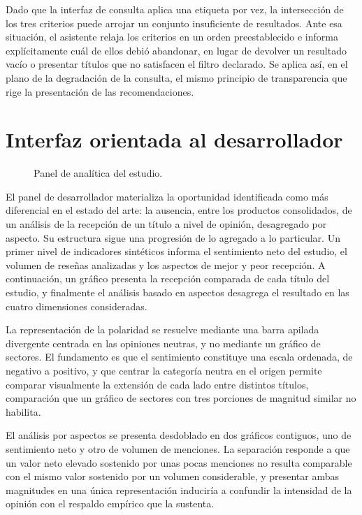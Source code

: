Dado que la interfaz de consulta aplica una etiqueta por vez, la intersección de los tres criterios puede arrojar un conjunto insuficiente de resultados. Ante esa situación, el asistente relaja los criterios en un orden preestablecido e informa explícitamente cuál de ellos debió abandonar, en lugar de devolver un resultado vacío o presentar títulos que no satisfacen el filtro declarado. Se aplica así, en el plano de la degradación de la consulta, el mismo principio de transparencia que rige la presentación de las recomendaciones.

\section*{Interfaz orientada al desarrollador}

\begin{figure}[ht]
	\centering
	\caption{Panel de analítica del estudio.}
	\label{fig:ui-panel-dev}
\end{figure}

El panel de desarrollador materializa la oportunidad identificada como más diferencial en el estado del arte: la ausencia, entre los productos consolidados, de un análisis de la recepción de un título a nivel de opinión, desagregado por aspecto. Su estructura sigue una progresión de lo agregado a lo particular. Un primer nivel de indicadores sintéticos informa el sentimiento neto del estudio, el volumen de reseñas analizadas y los aspectos de mejor y peor recepción. A continuación, un gráfico presenta la recepción comparada de cada título del estudio, y finalmente el análisis basado en aspectos desagrega el resultado en las cuatro dimensiones consideradas.

La representación de la polaridad se resuelve mediante una barra apilada divergente centrada en las opiniones neutras, y no mediante un gráfico de sectores. El fundamento es que el sentimiento constituye una escala ordenada, de negativo a positivo, y que centrar la categoría neutra en el origen permite comparar visualmente la extensión de cada lado entre distintos títulos, comparación que un gráfico de sectores con tres porciones de magnitud similar no habilita.

El análisis por aspectos se presenta desdoblado en dos gráficos contiguos, uno de sentimiento neto y otro de volumen de menciones. La separación responde a que un valor neto elevado sostenido por unas pocas menciones no resulta comparable con el mismo valor sostenido por un volumen considerable, y presentar ambas magnitudes en una única representación induciría a confundir la intensidad de la opinión con el respaldo empírico que la sustenta.

